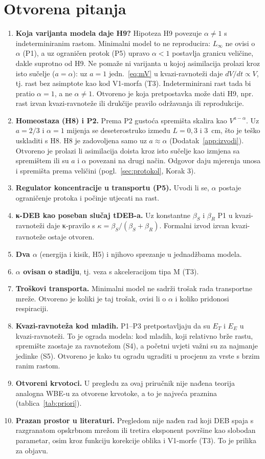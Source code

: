 \section{Otvorena pitanja}\label{sec:otvoreno}

\begin{enumerate}[leftmargin=1.6em]
\item \textbf{Koja varijanta modela daje H9?} Hipoteza H9 povezuje $\alpha\neq1$ s indeterminiranim rastom. Minimalni model to ne reproducira: $L_\infty$ ne ovisi o $\alpha$ (P1), a uz ograničen protok (P5) upravo $\alpha<1$ postavlja granicu veličine, dakle suprotno od H9. Ne pomaže ni varijanta u kojoj asimilacija prolazi kroz isto sučelje ($a=\alpha$): uz $a=1$ jedn.~\eqref{eq:mV} u kvazi-ravnoteži daje $dV/dt\propto V$, tj. rast bez asimptote kao kod V1-morfa (T3). Indeterminirani rast tada bi pratio $\alpha=1$, a ne $\alpha\neq1$. Otvoreno je koja pretpostavka može dati H9, npr. rast izvan kvazi-ravnoteže ili drukčije pravilo održavanja ili reprodukcije.
\item \textbf{Homeostaza (H8) i P2.} Prema P2 gustoća spremišta skalira kao $V^{a-\alpha}$. Uz $a=2/3$ i $\alpha=1$ mijenja se deseterostruko između $L=0{,}3$ i $3$~cm, što je teško uskladiti s H8. H8 je zadovoljena samo uz $a\approx\alpha$ (Dodatak~\ref{app:izvodi}). Otvoreno je prolazi li asimilacija doista kroz isto sučelje kao izmjena sa spremištem ili su $a$ i $\alpha$ povezani na drugi način. Odgovor daju mjerenja unosa i spremišta prema veličini (pogl.~\ref{sec:protokol}, Korak 3).
\item \textbf{Regulator koncentracije u transportu (P5).} Uvodi li se, $\alpha$ postaje ograničenje protoka i počinje utjecati na rast.
\item \textbf{κ-DEB kao poseban slučaj tDEB-a.} Uz konstantne $\beta_S$ i $\beta_R$ P1 u kvazi-ravnoteži daje κ-pravilo s $\kappa=\beta_S/(\beta_S+\beta_R)$. Formalni izvod izvan kvazi-ravnoteže ostaje otvoren.
\item \textbf{Dva $\alpha$} (energija i kisik, H5) i njihovo sprezanje u jednadžbama modela.
\item \textbf{$\alpha$ ovisan o stadiju}, tj. veza s akceleracijom tipa M (T3).
\item \textbf{Troškovi transporta.} Minimalni model ne sadrži trošak rada transportne mreže. Otvoreno je koliki je taj trošak, ovisi li o $\alpha$ i koliko pridonosi respiraciji.
\item \textbf{Kvazi-ravnoteža kod mladih.} P1–P3 pretpostavljaju da su $E_T$ i $E_E$ u kvazi-ravnoteži. To je ograda modela: kod mladih, koji relativno brže rastu, spremište zaostaje za ravnotežom (S4), a početni uvjeti važni su za najmanje jedinke (S5). Otvoreno je kako tu ogradu ugraditi u procjenu za vrste s brzim ranim rastom.
\item \textbf{Otvoreni krvotoci.} U pregledu za ovaj priručnik nije nađena teorija analogna WBE-u za otvorene krvotoke, a to je najveća praznina (tablica~\ref{tab:priori}).
\item \textbf{Prazan prostor u literaturi.} Pregledom nije nađen rad koji DEB spaja s razgranatom opskrbnom mrežom ili tretira eksponent površine kao slobodan parametar, osim kroz funkciju korekcije oblika i V1-morfe (T3). To je prilika za objavu.
\end{enumerate}
